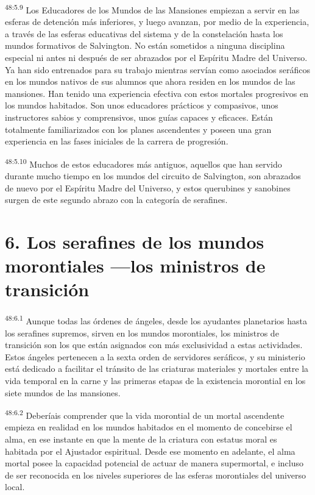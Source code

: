 \par
\textsuperscript{48:5.9} Los Educadores de los Mundos de las Mansiones empiezan a servir en las esferas de detención más inferiores, y luego avanzan, por medio de la experiencia, a través de las esferas educativas del sistema y de la constelación hasta los mundos formativos de Salvington. No están sometidos a ninguna disciplina especial ni antes ni después de ser abrazados por el Espíritu Madre del Universo. Ya han sido entrenados para su trabajo mientras servían como asociados seráficos en los mundos nativos de sus alumnos que ahora residen en los mundos de las mansiones. Han tenido una experiencia efectiva con estos mortales progresivos en los mundos habitados. Son unos educadores prácticos y compasivos, unos instructores sabios y comprensivos, unos guías capaces y eficaces. Están totalmente familiarizados con los planes ascendentes y poseen una gran experiencia en las fases iniciales de la carrera de progresión.

\par
\textsuperscript{48:5.10} Muchos de estos educadores más antiguos, aquellos que han servido durante mucho tiempo en los mundos del circuito de Salvington, son abrazados de nuevo por el Espíritu Madre del Universo, y estos querubines y sanobines surgen de este segundo abrazo con la categoría de serafines.

\section*{6. Los serafines de los mundos morontiales ---los ministros de transición}
\par
\textsuperscript{48:6.1} Aunque todas las órdenes de ángeles, desde los ayudantes planetarios hasta los serafines supremos, sirven en los mundos morontiales, los ministros de transición son los que están asignados con más exclusividad a estas actividades. Estos ángeles pertenecen a la sexta orden de servidores seráficos, y su ministerio está dedicado a facilitar el tránsito de las criaturas materiales y mortales entre la vida temporal en la carne y las primeras etapas de la existencia morontial en los siete mundos de las mansiones.

\par
\textsuperscript{48:6.2} Deberíais comprender que la vida morontial de un mortal ascendente empieza en realidad en los mundos habitados en el momento de concebirse el alma, en ese instante en que la mente de la criatura con estatus moral es habitada por el Ajustador espiritual. Desde ese momento en adelante, el alma mortal posee la capacidad potencial de actuar de manera supermortal, e incluso de ser reconocida en los niveles superiores de las esferas morontiales del universo local.

